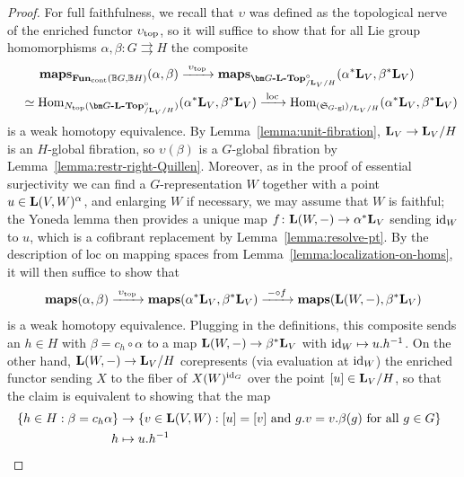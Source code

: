 \documentclass[reqno]{memo-l}
\theoremstyle{mythm}
\theoremstyle{definition}
\numberwithin{equation}{section}
\renewcommand{\top}{{\textup{top}}}
\renewcommand{\hom}{\textup{hom}}
\newcommand{\Ntop}{{N_\textup{top}}}
\newcommand{\cat}[1]{\textbf{\textup{#1}}}
\newcommand{\maps}{\cat{maps}}
\renewcommand{\hom}{{\textup{Hom}}}
\newcommand{\id}{\textup{id}}
\newcommand{\BGcat}[1]{\mathbb B{#1}}
\newcommand{\myS}{{{\mathfrak S\kern-.4pt}}}
\begin{document}
\begin{proof}
    For {full faithfulness}, we recall that $\upsilon$ was defined as the topological nerve of the enriched functor $\upsilon_\top$, so it will suffice to show that for all Lie group homomorphisms $\alpha,\beta\colon G\rightrightarrows H$ the composite
    \begin{multline*}
        \hskip-10pt\maps_{\cat{Fun}_\text{cont}(\BGcat{G},\BGcat{H})}(\alpha,\beta)\xrightarrow{\;\upsilon_\top\;}
        \maps_{\cat{$\bm G$-$\cat{L}$-Top}^\circ_{/\cat{L}_V/H}}(\alpha^*\cat{L}_V,\beta^*\cat{L}_V)\\{}\simeq\hom_{\Ntop(\cat{$\bm G$-$\cat{L}$-Top}^\circ_{/\cat{L}_V/H})}(\alpha^*\cat{L}_V, \beta^*\cat{L}_V)       
        \xrightarrow{\;\text{loc}\;}\hom_{(\myS_\text{$G$-gl})_{/\cat{L}_V/H}}(\alpha^*\cat{L}_V, \beta^*\cat{L}_V)\hskip-10pt
    \end{multline*}
    is a weak homotopy equivalence. By Lemma~\ref{lemma:unit-fibration}, $\cat{L}_V\to\cat{L}_V/H$ is an $H$-global fibration, so $\upsilon(\beta)$ is a $G$-global fibration by Lemma~\ref{lemma:restr-right-Quillen}. Moreover, as in the proof of essential surjectivity we can find a $G$-representation $W$ together with a point $u\in\cat{L}(V,W)^\alpha$, and enlarging $W$ if necessary, we may assume that $W$ is faithful; the Yoneda lemma then provides a unique map $f\colon\cat{L}(W,-)\to\alpha^*\cat{L}_V$ sending $\id_W$ to $u$, which is a cofibrant replacement by Lemma~\ref{lemma:resolve-pt}. By the description of $\text{loc}$ on mapping spaces from Lemma~\ref{lemma:localization-on-homs}, it will then suffice to show that
    \[
        \maps(\alpha,\beta)\xrightarrow{\;\upsilon_\top\;}
        \maps(\alpha^*\cat{L}_V,\beta^*\cat{L}_V)
        \xrightarrow{\;{-}\circ f\;}\maps(\cat{L}(W,-),\beta^*\cat{L}_V)
    \]
    is a weak homotopy equivalence. Plugging in the definitions, this composite sends an $h\in H$ with $\beta=c_h\circ\alpha$ to a map $\cat{L}(W,-)\to\beta^*\cat{L}_V$ with $\id_W\mapsto u.h^{-1}$. On the other hand, $\cat{L}(W,-)\to\cat{L}_V/H$ corepresents (via evaluation at $\id_W$) the enriched functor sending $X$ to the fiber of $X(W)^{\id_G}$ over the point $[u]\in\cat{L}_V/H$, so that the claim is equivalent to showing that the map
    \begin{equation}\label{eq:upsilon-top-explicit}
        \begin{aligned}
            \hskip-7pt\{h\in H: \beta=c_h\alpha\} &\rightarrow \{v\in\cat{L}(V,W): [u]=[v]\text{ and } g.v=v.\beta(g)\text{ for all $g\in G$}\}\hskip-1pt\\
            h&\mapsto u.h^{-1}

\end{aligned}
\end{equation}
\end{proof}
\end{document}
